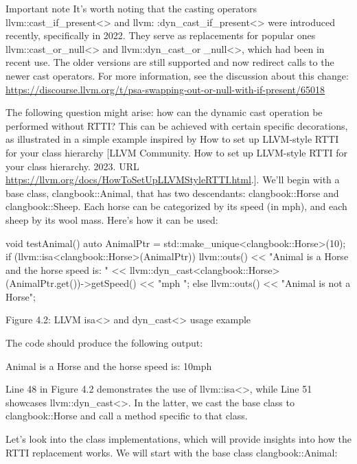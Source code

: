 \begin{myNotic}{Important note}
It’s worth noting that the casting operators llvm::cast\_if\_present<> and llvm: :dyn\_cast\_if\_present<> were introduced recently, specifically in 2022. They serve as replacements for popular ones llvm::cast\_or\_null<> and llvm::dyn\_cast\_or \_null<>, which had been in recent use. The older versions are still supported and now redirect calls to the newer cast operators. For more information, see the discussion about this change: \url{https://discourse.llvm.org/t/psa-swapping-out-or-null-with-if-present/65018}
\end{myNotic}

The following question might arise: how can the dynamic cast operation be performed without RTTI? This can be achieved with certain specific decorations, as illustrated in a simple example inspired by How to set up LLVM-style RTTI for your class hierarchy [LLVM Community. How to set up LLVM-style RTTI for your class hierarchy. 2023. URL \url{https://llvm.org/docs/HowToSetUpLLVMStyleRTTI.html}.]. We’ll begin with a base class, clangbook::Animal, that has two descendants: clangbook::Horse and clangbook::Sheep. Each horse can be categorized by its speed (in mph), and each sheep by its wool mass. Here’s how it can be used:

\begin{cpp}
void testAnimal() {
  auto AnimalPtr = std::make_unique<clangbook::Horse>(10);
  if (llvm::isa<clangbook::Horse>(AnimalPtr)) {
    llvm::outs()
      << "Animal is a Horse and the horse speed is: "
      << llvm::dyn_cast<clangbook::Horse>(AnimalPtr.get())->getSpeed()
      << "mph \n";
  } else {
    llvm::outs() << "Animal is not a Horse\n";
  }
}
\end{cpp}

\begin{center}
Figure 4.2: LLVM isa<> and dyn\_cast<> usage example
\end{center}

The code should produce the following output:

\begin{shell}
Animal is a Horse and the horse speed is: 10mph
\end{shell}

Line 48 in Figure 4.2 demonstrates the use of llvm::isa<>, while Line 51 showcases llvm::dyn\_cast<>. In the latter, we cast the base class to clangbook::Horse and call a method specific to that class.

Let’s look into the class implementations, which will provide insights into how the RTTI replacement works. We will start with the base class clangbook::Animal:

